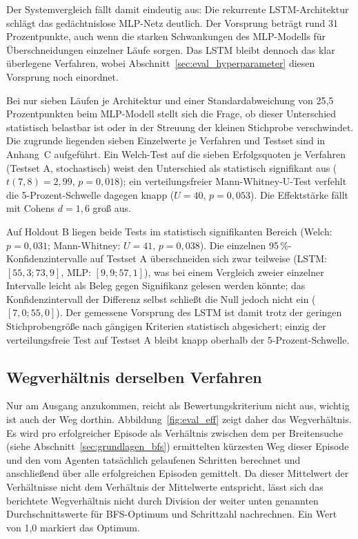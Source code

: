 \documentclass[
  a4paper,
  11pt,
  twoside,
  BCOR=8mm,           %
  headings=big,
  numbers=noenddot,
  listof=totoc,       %
  captions=tableheading,
]{scrreprt}
\begin{document}
Der Systemvergleich fällt damit eindeutig aus: Die rekurrente LSTM-Architektur schlägt das gedächtnislose MLP-Netz deutlich. Der Vorsprung beträgt rund 31 Prozentpunkte, auch wenn die starken Schwankungen des MLP-Modells für Überschneidungen einzelner Läufe sorgen. Das LSTM bleibt dennoch das klar überlegene Verfahren, wobei Abschnitt~\ref{sec:eval_hyperparameter} diesen Vorsprung noch einordnet.

Bei nur sieben Läufen je Architektur und einer Standardabweichung von 25,5 Prozentpunkten beim MLP-Modell stellt sich die Frage, ob dieser Unterschied statistisch belastbar ist oder in der Streuung der kleinen Stichprobe verschwindet. Die zugrunde liegenden sieben Einzelwerte je Verfahren und Testset sind in Anhang~C aufgeführt. Ein Welch-Test auf die sieben Erfolgsquoten je Verfahren (Testset A, stochastisch) weist den Unterschied als statistisch signifikant aus ($t(7{,}8) = 2{,}99$, $p = 0{,}018$); ein verteilungsfreier Mann-Whitney-U-Test verfehlt die 5-Prozent-Schwelle dagegen knapp ($U = 40$, $p = 0{,}053$). Die Effektstärke fällt mit Cohens $d = 1{,}6$ groß aus.

Auf Holdout B liegen beide Tests im statistisch signifikanten Bereich (Welch: $p = 0{,}031$; Mann-Whitney: $U = 41$, $p = 0{,}038$). Die einzelnen 95\,\%-Konfidenzintervalle auf Testset A überschneiden sich zwar teilweise (LSTM: $[55{,}3; 73{,}9]$, MLP: $[9{,}9; 57{,}1]$), was bei einem Vergleich zweier einzelner Intervalle leicht als Beleg gegen Signifikanz gelesen werden könnte; das Konfidenzintervall der Differenz selbst schließt die Null jedoch nicht ein ($[7{,}0; 55{,}0]$). Der gemessene Vorsprung des LSTM ist damit trotz der geringen Stichprobengröße nach gängigen Kriterien statistisch abgesichert; einzig der verteilungsfreie Test auf Testset A bleibt knapp oberhalb der 5-Prozent-Schwelle.

\subsection{Wegverhältnis derselben Verfahren}
\label{sec:eval_eff}
Nur am Ausgang anzukommen, reicht als Bewertungskriterium nicht aus, wichtig ist auch der Weg dorthin. Abbildung~\ref{fig:eval_eff} zeigt daher das Wegverhältnis. Es wird pro erfolgreicher Episode als Verhältnis zwischen dem per Breitensuche (siehe Abschnitt~\ref{sec:grundlagen_bfs}) ermittelten kürzesten Weg dieser Episode und den vom Agenten tatsächlich gelaufenen Schritten berechnet und anschließend über alle erfolgreichen Episoden gemittelt. Da dieser Mittelwert der Verhältnisse nicht dem Verhältnis der Mittelwerte entspricht, lässt sich das berichtete Wegverhältnis nicht durch Division der weiter unten genannten Durchschnittswerte für BFS-Optimum und Schrittzahl nachrechnen. Ein Wert von 1,0 markiert das Optimum.
\end{document}
